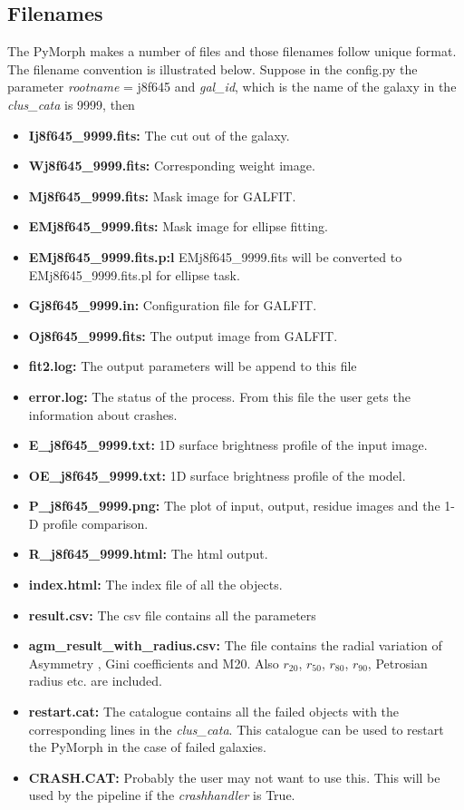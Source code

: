 \documentclass[a4paper,10pt]{article}
\begin{document}
\subsection{Filenames}
The PyMorph makes a number of files and those filenames follow unique format. The filename convention is illustrated below. Suppose in the config.py the parameter \textit{rootname} = j8f645 and \textit{gal\_id}, which is the name of the galaxy in the \textit{clus\_cata} is 9999, then
\begin{itemize}
\item \textbf{Ij8f645\_9999.fits:} The cut out of the galaxy.
\item \textbf{Wj8f645\_9999.fits:} Corresponding weight image.
\item \textbf{Mj8f645\_9999.fits:} Mask image for GALFIT.
\item \textbf{EMj8f645\_9999.fits:} Mask image for ellipse fitting.
\item \textbf{EMj8f645\_9999.fits.p:l} EMj8f645\_9999.fits will be converted to EMj8f645\_9999.fits.pl for
 ellipse task.
\item \textbf{Gj8f645\_9999.in:} Configuration file for GALFIT.
\item \textbf{Oj8f645\_9999.fits:} The output image from GALFIT.
\item \textbf{fit2.log:} The output parameters will be append to this file
\item \textbf{error.log:} The status of the process. From this file the user gets the information about crashes.
\item \textbf{E\_j8f645\_9999.txt:} 1D surface brightness profile of the input image.
\item \textbf{OE\_j8f645\_9999.txt:} 1D surface brightness profile of the model.
\item \textbf{P\_j8f645\_9999.png:} The plot of input, output, residue images and the 1-D profile comparison.
\item \textbf{R\_j8f645\_9999.html:} The html output.
\item \textbf{index.html:} The index file of all the objects.
\item \textbf{result.csv:} The csv file contains all the parameters
\item \textbf{agm\_result\_with\_radius.csv:} The file contains the radial variation of Asymmetry , Gini coefficients and M20. Also $r_{20}$, $r_{50}$, $r_{80}$, $r_{90}$, Petrosian radius etc. are included.
\item \textbf{restart.cat:} The catalogue contains all the failed objects with the corresponding lines in the \textit{clus\_cata}. This catalogue can be used to restart the PyMorph in the case of failed galaxies.
\item \textbf{CRASH.CAT:} Probably the user may not want to use this. This will be used by the pipeline if the \textit{crashhandler} is True.
\end{itemize}
\end{document}
